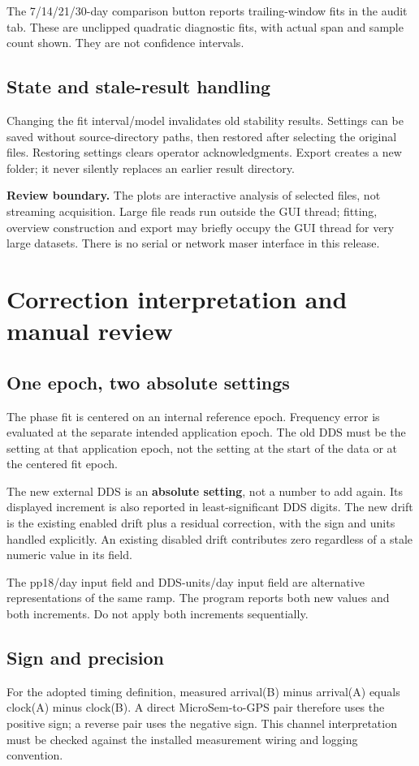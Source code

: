 \documentclass[11pt,a4paper]{article}
\newcommand{\warning}[1]{\par\noindent\colorbox{light}{\parbox{\dimexpr\linewidth-2\fboxsep}{\textbf{Review boundary.} #1}}\par}
\begin{document}
The 7/14/21/30-day comparison button reports trailing-window fits in the audit
tab. These are unclipped quadratic diagnostic fits, with actual span and
sample count shown. They are not confidence intervals.

\subsection{State and stale-result handling}
Changing the fit interval/model invalidates old stability results. Settings
can be saved without source-directory paths, then restored after selecting the
original files. Restoring settings clears operator acknowledgments. Export
creates a new folder; it never silently replaces an earlier result directory.

\warning{The plots are interactive analysis of selected files, not streaming
acquisition. Large file reads run outside the GUI thread; fitting, overview
construction and export may briefly occupy the GUI thread for very large
datasets. There is no serial or network maser interface in this release.}
\clearpage

\section{Correction interpretation and manual review}
\subsection{One epoch, two absolute settings}
The phase fit is centered on an internal reference epoch. Frequency error is
evaluated at the separate intended application epoch. The old DDS must be the
setting at that application epoch, not the setting at the start of the data
or at the centered fit epoch.

The new external DDS is an \textbf{absolute setting}, not a number to add
again. Its displayed increment is also reported in least-significant DDS
digits. The new drift is the existing enabled drift plus a residual correction,
with the sign and units handled explicitly. An existing disabled drift
contributes zero regardless of a stale numeric value in its field.

The pp18/day input field and DDS-units/day input field are alternative
representations of the same ramp. The program reports both new values and
both increments. Do not apply both increments sequentially.

\subsection{Sign and precision}
For the adopted timing definition, measured arrival(B) minus arrival(A)
equals clock(A) minus clock(B). A direct MicroSem-to-GPS pair therefore uses
the positive sign; a reverse pair uses the negative sign. This channel
interpretation must be checked against the installed measurement wiring and
logging convention.
\end{document}
